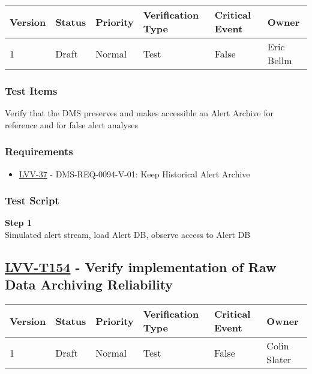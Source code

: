 \begin{longtable}[]{@{}llllll@{}}
\toprule
Version & Status & Priority & Verification Type & Critical Event &
Owner\tabularnewline
\midrule
\endhead
1 & Draft & Normal & Test & False & Eric Bellm\tabularnewline
\bottomrule
\end{longtable}

\subsubsection{Test Items}\label{test-items-21}

Verify that the DMS preserves and makes accessible an Alert Archive for
reference and for false alert analyses

\subsubsection{Requirements}\label{requirements-21}

\begin{itemize}
\tightlist
\item
  \href{https://jira.lsstcorp.org/browse/LVV-37}{LVV-37} -
  DMS-REQ-0094-V-01: Keep Historical Alert Archive
\end{itemize}

\subsubsection{Test Script}\label{test-script-21}

\textbf{Step 1}\\
Simulated alert stream, load Alert DB, observe access to Alert
DB\\[2\baselineskip]

\hypertarget{lvv-t154---verify-implementation-of-raw-data-archiving-reliability}{\subsection{\texorpdfstring{\href{https://jira.lsstcorp.org/secure/Tests.jspa\#/testCase/LVV-T154}{LVV-T154}
- Verify implementation of Raw Data Archiving
Reliability}{LVV-T154 - Verify implementation of Raw Data Archiving Reliability}}\label{lvv-t154---verify-implementation-of-raw-data-archiving-reliability}}

\begin{longtable}[]{@{}llllll@{}}
\toprule
Version & Status & Priority & Verification Type & Critical Event &
Owner\tabularnewline
\midrule
\endhead
1 & Draft & Normal & Test & False & Colin Slater\tabularnewline
\bottomrule
\end{longtable}

